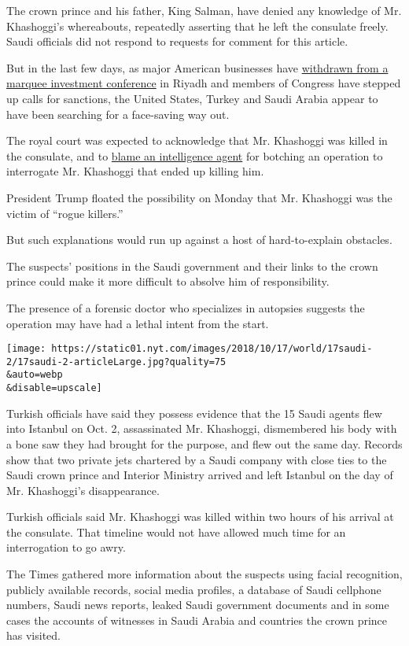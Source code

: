 The crown prince and his father, King Salman, have denied any knowledge
of Mr. Khashoggi's whereabouts, repeatedly asserting that he left the
consulate freely. Saudi officials did not respond to requests for
comment for this article.

But in the last few days, as major American businesses have
\href{https://www.nytimes.com/2018/10/15/business/dealbook/blackstone-blackrock-saudi-conference.html}{withdrawn
from a marquee investment conference} in Riyadh and members of Congress
have stepped up calls for sanctions, the United States, Turkey and Saudi
Arabia appear to have been searching for a face-saving way out.

The royal court was expected to acknowledge that Mr. Khashoggi was
killed in the consulate, and to
\href{https://www.nytimes.com/2018/10/15/us/politics/trump-saudi-king-journalist-khashoggi.html}{blame
an intelligence agent} for botching an operation to interrogate Mr.
Khashoggi that ended up killing him.

President Trump floated the possibility on Monday that Mr. Khashoggi was
the victim of ``rogue killers.''

But such explanations would run up against a host of hard-to-explain
obstacles.

The suspects' positions in the Saudi government and their links to the
crown prince could make it more difficult to absolve him of
responsibility.

The presence of a forensic doctor who specializes in autopsies suggests
the operation may have had a lethal intent from the start.

\texttt{[image: https://static01.nyt.com/images/2018/10/17/world/17saudi-2/17saudi-2-articleLarge.jpg?quality=75\\\&auto=webp\\\&disable=upscale]}

Turkish officials have said they possess evidence that the 15 Saudi
agents flew into Istanbul on Oct. 2, assassinated Mr. Khashoggi,
dismembered his body with a bone saw they had brought for the purpose,
and flew out the same day. Records show that two private jets chartered
by a Saudi company with close ties to the Saudi crown prince and
Interior Ministry arrived and left Istanbul on the day of Mr.
Khashoggi's disappearance.

Turkish officials said Mr. Khashoggi was killed within two hours of his
arrival at the consulate. That timeline would not have allowed much time
for an interrogation to go awry.

The Times gathered more information about the suspects using facial
recognition, publicly available records, social media profiles, a
database of Saudi cellphone numbers, Saudi news reports, leaked Saudi
government documents and in some cases the accounts of witnesses in
Saudi Arabia and countries the crown prince has visited.

